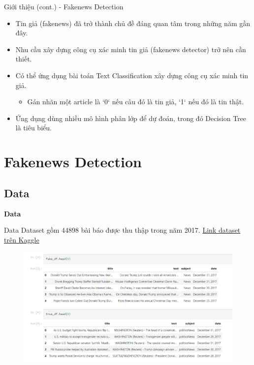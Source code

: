 \documentclass[aspectratio=169,xcolor=dvipsnames]{beamer}
\begin{document}
\begin{frame}{Giới thiệu (cont.) - Fakenews Detection}
\begin{itemize}
\item Tin giả (fakenews) đã trở thành chủ đề đáng quan tâm trong những năm gần đây.
\item Nhu cầu xây dựng công cụ xác minh tin giả (fakenews detector) trở nên cần thiết.
\item Có thể ứng dụng bài toán Text Classification xây dựng công cụ xác minh tin giả.
\begin{itemize}
    \item Gán nhãn một article là `0` nếu câu đó là tin giả, `1` nếu đó là tin thật.
\end{itemize}
\item Ứng dụng dùng nhiều mô hình phân lớp để dự đoán, trong đó Decision Tree là tiêu biểu.
\end{itemize}
\end{frame}

\section{Fakenews Detection}

\subsection{Data}
\begin{frame}
	\Huge{\centerline{\textbf{Data}}}
\end{frame}

\begin{frame}{Data}
Dataset gồm 44898 bài báo được thu thập trong năm 2017. \href{https://www.kaggle.com/datasets/clmentbisaillon/fake-and-real-news-dataset}{Link dataset trên Kaggle}
\begin{figure}
\includegraphics[width=0.8\linewidth]{img/quick-glance-at-data.PNG}
\end{figure}
\end{frame}
\end{document}
